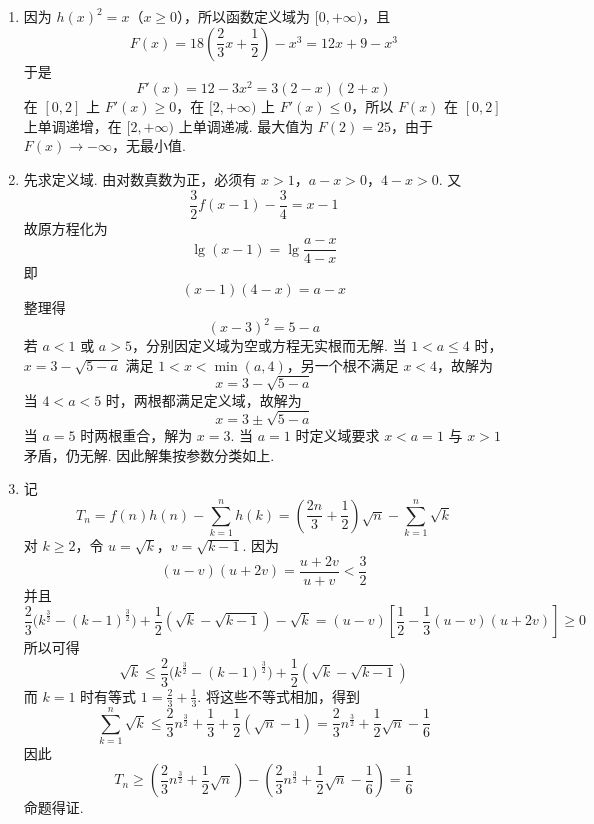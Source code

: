 \begin{solution}
\begin{enumerate}
\item 因为 \(h(x)^2=x\)（\(x\geqslant0\)），所以函数定义域为 \([0,+\infty)\)，且
\[
F(x)=18\left(\frac23x+\frac12\right)-x^3=12x+9-x^3
\]
于是
\[
F'(x)=12-3x^2=3(2-x)(2+x)
\]
在 \([0,2]\) 上 \(F'(x)\geqslant0\)，在 \([2,+\infty)\) 上 \(F'(x)\leqslant0\)，所以 \(F(x)\) 在 \([0,2]\) 上单调递增，在 \([2,+\infty)\) 上单调递减. 最大值为 \(F(2)=25\)，由于 \(F(x)\to-\infty\)，无最小值.
\item 先求定义域. 由对数真数为正，必须有 \(x>1\)，\(a-x>0\)，\(4-x>0\). 又
\[
\frac32f(x-1)-\frac34=x-1
\]
故原方程化为
\[
\lg(x-1)=\lg\frac{a-x}{4-x}
\]
即
\[
(x-1)(4-x)=a-x
\]
整理得
\[
(x-3)^2=5-a
\]
若 \(a<1\) 或 \(a>5\)，分别因定义域为空或方程无实根而无解. 当 \(1<a\leqslant4\) 时，\(x=3-\sqrt{5-a}\) 满足 \(1<x<\min(a,4)\)，另一个根不满足 \(x<4\)，故解为
\[
x=3-\sqrt{5-a}
\]
当 \(4<a<5\) 时，两根都满足定义域，故解为
\[
x=3\pm\sqrt{5-a}
\]
当 \(a=5\) 时两根重合，解为 \(x=3\). 当 \(a=1\) 时定义域要求 \(x<a=1\) 与 \(x>1\) 矛盾，仍无解. 因此解集按参数分类如上.
\item 记
\[
T_n=f(n)h(n)-\sum_{k=1}^{n}h(k)=\left(\frac{2n}{3}+\frac12\right)\sqrt n-\sum_{k=1}^{n}\sqrt k
\]
对 \(k\geqslant2\)，令 \(u=\sqrt k\)，\(v=\sqrt{k-1}\). 因为
\[
(u-v)(u+2v)=\frac{u+2v}{u+v}<\frac32
\]
并且
\[
\frac23\bigl(k^{\frac{3}{2}}-(k-1)^{\frac{3}{2}}\bigr)+\frac12(\sqrt k-\sqrt{k-1})-\sqrt k=(u-v)\left[\frac12-\frac13(u-v)(u+2v)\right]\geqslant0
\]
所以可得
\[
\sqrt k\leqslant\frac23\bigl(k^{\frac{3}{2}}-(k-1)^{\frac{3}{2}}\bigr)+\frac12(\sqrt k-\sqrt{k-1})
\]
而 \(k=1\) 时有等式 \(1=\frac23+\frac13\). 将这些不等式相加，得到
\[
\sum_{k=1}^{n}\sqrt k\leqslant\frac23n^{\frac{3}{2}}+\frac13+\frac12(\sqrt n-1)=\frac23n^{\frac{3}{2}}+\frac12\sqrt n-\frac16
\]
因此
\[
T_n\geqslant\left(\frac23n^{\frac{3}{2}}+\frac12\sqrt n\right)-\left(\frac23n^{\frac{3}{2}}+\frac12\sqrt n-\frac16\right)=\frac16
\]
命题得证.
\end{enumerate}
\end{solution}

